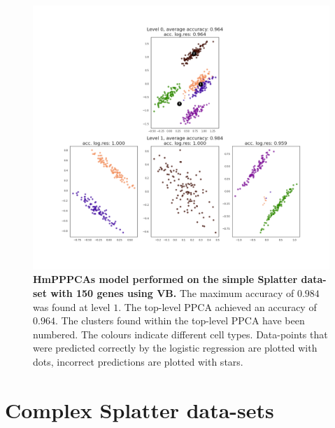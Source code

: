 \begin{figure}
    \centering
    \includegraphics[width=\linewidth]{figs/simple_150_vb.png}
    \caption[HmPPPCAs model performed on the simple Splatter data-set with 150 genes using VB]{\small \textbf{HmPPPCAs model performed on the simple Splatter data-set with 150 genes using VB.} \small The maximum accuracy of $0.984$ was found at level $1$. The top-level PPCA achieved an accuracy of $0.964$. The clusters found within the top-level PPCA have been numbered. The colours indicate different cell types. Data-points that were predicted correctly by the logistic regression are plotted with dots, incorrect predictions are plotted with stars.}
    \label{fig:simple_150_vb}
\end{figure}

\clearpage

\section{Complex Splatter data-sets}\label{sec:complex}

